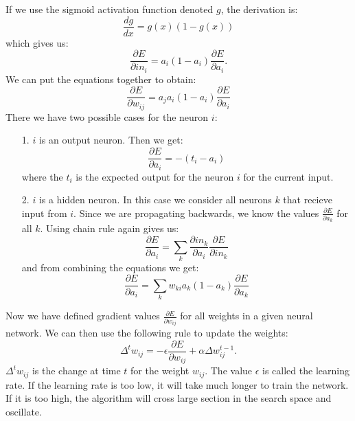 If we use the sigmoid activation function denoted $g$, the derivation is:
\begin{equation*}
\frac{dg}{dx}  =  g(x)(1-g(x))
\end{equation*}
which gives us:
\begin{equation*}
\frac{\partial E}{\partial in_{i}} = a_{i}(1-a_{i}) \frac{\partial E}{\partial a_{i}}.
\end{equation*}
We can put the equations together to obtain:
\begin{equation*}
\frac{\partial E}{\partial w_{ij}} = a_{j} a_{i}(1-a_{i}) \frac{\partial E}{\partial a_{i}}
\end{equation*}
There we have two possible cases for the neuron $i$:
\begin{enumerate}
\item [1.] $i$ is an output neuron. Then we get: 
	\begin{equation*}
	\frac{\partial E}{\partial a_{i}} = -(t_{i} - a_{i})
	\end{equation*}
	where the $t_{i}$ is the expected output for the neuron $i$ for the current input.

\item [2.] $i$ is a hidden neuron. In this case we consider all neurons $k$ that recieve input from $i$. Since we are propagating backwards, we know the values $\frac{\partial E}{\partial a_{k}}$ for all $k$. Using chain rule again gives us:
	\begin{equation*}
	\frac{\partial E}{\partial a_{i}} = \sum_{k} \frac{\partial in_{k}}{\partial a_{i}} \frac{\partial E}{\partial in_{k}}
	\end{equation*}
and from combining the equations we get:
	\begin{equation*}
	\frac{\partial E}{\partial a_{i}} = \sum_{k} w_{ki}a_{k}(1-a_{k}) \frac{\partial E}{\partial a_{k}}
	\end{equation*}
\end{enumerate}
Now we have defined gradient values $\frac{\partial E}{\partial w_{ij}}$ for all weights in a given neural network.
We can then use the following rule to update the weights:
\begin{equation*}
\Delta^{t} w_{ij} = - \epsilon \frac {\partial E}{\partial w_{ij}} + \alpha \Delta w^{t-1}_{ij}.
\end{equation*}
$\Delta^{t} w_{ij}$ is the change at time $t$ for the weight $w_{ij}$. The value $\epsilon$ is called the learning rate. If the learning rate is too low, it will take much longer to train the network. If it is too high, the algorithm will cross large section in the search space and oscillate.

